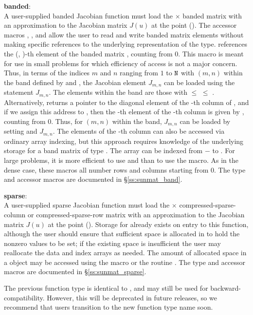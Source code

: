 { {\bf banded}:\\
  A user-supplied banded Jacobian function must load the  $\times$ 
  banded matrix  with an approximation to the Jacobian matrix $J(u)$
  at the point ().
  The accessor macros ,
  , and  allow the user
  to read and write banded matrix elements without making specific
  references to the underlying representation of the {\sunmatband}
  type.   references the (,
  )-th element of the banded matrix , counting from $0$.
  This macro is meant for use in small problems for which efficiency
  of access is not a major concern.  Thus, in terms of the indices $m$
  and $n$ ranging from $1$ to ${\tt N}$ with $(m,n)$ within the band defined
  by  and , the Jacobian element $J_{m,n}$ can
  be loaded using the statement 
  $J_{m,n}$. The elements within the band are those with 
  $\le$  $\le$ . Alternatively,
   returns a pointer to the diagonal element
  of the -th column of , and if we assign this address
  to , then the -th element of the
  -th column is given by
  , counting from $0$.  Thus,
  for $(m,n)$ within the band, $J_{m,n}$ can be loaded by setting
   and
   $J_{m,n}$.  The
  elements of the -th column can also be accessed via ordinary
  array indexing, but this approach requires knowledge of the
  underlying storage for a band matrix of type {\sunmatband}.
  The array  can be indexed from $-$ to
  . For large problems, it is more efficient to use
   and  than to use the
   macro.  As in the dense case, these macros all
  number rows and columns starting from $0$.  The {\sunmatband} type
  and accessor macros are documented in \S\ref{ss:sunmat_band}.

  {\bf sparse}:\\
  A user-supplied sparse Jacobian function must load the  $\times$ 
  compressed-sparse-column or compressed-sparse-row matrix 
  with an approximation to the Jacobian matrix $J(u)$
  at the point ().
  Storage for  already exists on entry to
  this function, although the user should ensure that sufficient space
  is allocated in  to hold the nonzero values to be set; if
  the existing space is insufficient the user may reallocate the data
  and index arrays as needed.  The amount of allocated space in a
  {\sunmatsparse} object may be accessed using the macro
   or the routine .  The
  {\sunmatsparse} type and accessor macros are documented in
  \S\ref{ss:sunmat_sparse}.

  The previous function type  is identical to
  , and may still be used for backward-compatibility.
  However, this will be deprecated in future releases, so we recommend
  that users transition to the new function type name soon.
}
